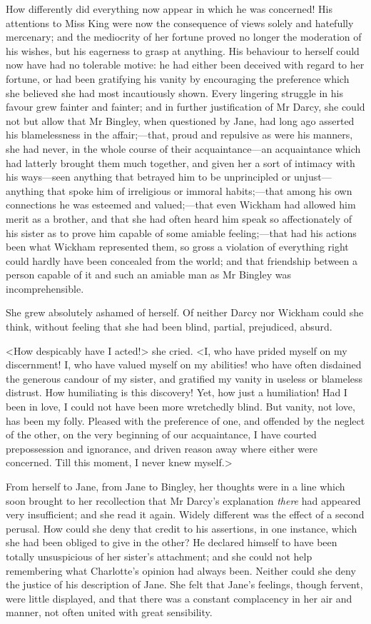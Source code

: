 How differently did everything now appear in which he was concerned! His attentions to Miss King were now the consequence of views solely and hatefully mercenary; and the mediocrity of her fortune proved no longer the moderation of his wishes, but his eagerness to grasp at anything. His behaviour to herself could now have had no tolerable motive: he had either been deceived with regard to her fortune, or had been gratifying his vanity by encouraging the preference which she believed she had most incautiously shown. Every lingering struggle in his favour grew fainter and fainter; and in further justification of Mr Darcy, she could not but allow that Mr Bingley, when questioned by Jane, had long ago asserted his blamelessness in the affair;—that, proud and repulsive as were his manners, she had never, in the whole course of their acquaintance—an acquaintance which had latterly brought them much together, and given her a sort of intimacy with his ways—seen anything that betrayed him to be unprincipled or unjust—anything that spoke him of irreligious or immoral habits;—that among his own connections he was esteemed and valued;—that even Wickham had allowed him merit as a brother, and that she had often heard him speak so affectionately of his sister as to prove him capable of some amiable feeling;—that had his actions been what Wickham represented them, so gross a violation of everything right could hardly have been concealed from the world; and that friendship between a person capable of it and such an amiable man as Mr Bingley was incomprehensible.

She grew absolutely ashamed of herself. Of neither Darcy nor Wickham could she think, without feeling that she had been blind, partial, prejudiced, absurd.

<How despicably have I acted!> she cried. <I, who have prided myself on my discernment! I, who have valued myself on my abilities! who have often disdained the generous candour of my sister, and gratified my vanity in useless or blameless distrust. How humiliating is this discovery! Yet, how just a humiliation! Had I been in love, I could not have been more wretchedly blind. But vanity, not love, has been my folly. Pleased with the preference of one, and offended by the neglect of the other, on the very beginning of our acquaintance, I have courted prepossession and ignorance, and driven reason away where either were concerned. Till this moment, I never knew myself.>

From herself to Jane, from Jane to Bingley, her thoughts were in a line which soon brought to her recollection that Mr Darcy's explanation \textit{there} had appeared very insufficient; and she read it again. Widely different was the effect of a second perusal. How could she deny that credit to his assertions, in one instance, which she had been obliged to give in the other? He declared himself to have been totally unsuspicious of her sister's attachment; and she could not help remembering what Charlotte's opinion had always been. Neither could she deny the justice of his description of Jane. She felt that Jane's feelings, though fervent, were little displayed, and that there was a constant complacency in her air and manner, not often united with great sensibility.

